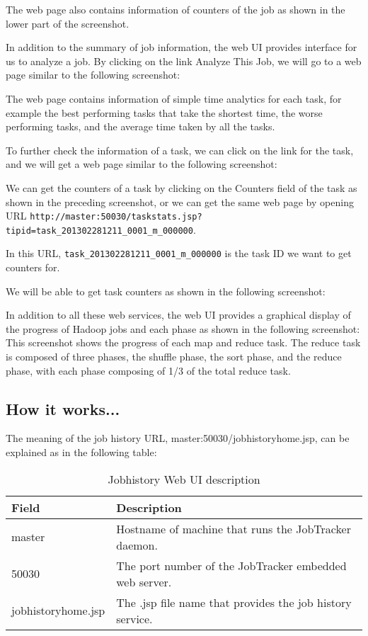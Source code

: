 The web page also contains information of counters of the job as shown in the lower part of the screenshot.

In addition to the summary of job information, the web UI provides interface for us to analyze a job. By clicking on the link Analyze This Job, we will go to a web page similar to the following screenshot:

The web page contains information of simple time analytics for each task, for example the best performing tasks that take the shortest time, the worse performing tasks, and the average time taken by all the tasks.

To further check the information of a task, we can click on the link for the task, and we will get a web page similar to the following screenshot:

We can get the counters of a task by clicking on the Counters field of the task as shown in the preceding screenshot, or we can get the same web page by opening URL \verb|http://master:50030/taskstats.jsp?tipid=task_201302281211_0001_m_000000|.

In this URL, \verb|task_201302281211_0001_m_000000| is the task ID we want to get counters for.

We will be able to get task counters as shown in the following screenshot: 

In addition to all these web services, the web UI provides a graphical display of the progress of Hadoop jobs and each phase as shown in the following screenshot: \\

This screenshot shows the progress of each map and reduce task. The reduce task is composed of three phases, the shuffle phase, the sort phase, and the reduce phase, with each phase composing of 1/3 of the total reduce task.

\subsection*{How it works...}
The meaning of the job history URL, master:50030/jobhistoryhome.jsp, can be explained as in the following table:

\begin{table}
  \centering
  \begin{tabular}{ll}
    \toprule 
    \textbf{Field} & \textbf{Description} \\  \midrule
    master & Hostname of machine that runs the JobTracker daemon. \\
    50030 & The port number of the JobTracker embedded web server. \\
    jobhistoryhome.jsp & The .jsp file name that provides the job history service. \\ \bottomrule
  \end{tabular}
  \caption{Jobhistory Web UI description}\label{tbl:jobhistory}
\end{table}

